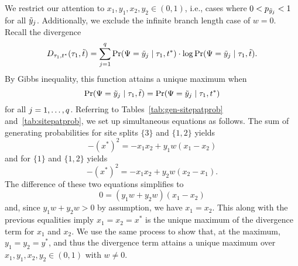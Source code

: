 We restrict our attention to $x_1,y_1,x_2,y_2\in(0,1)$, i.e., cases where $0<p_{\tilde{y}_j}<1$ for all $\tilde{y}_j$.
Additionally, we exclude the infinite branch length case of $w=0$.
Recall the divergence
\[
D_{\tau_1,t^*}(\tau_1,\tilde{t}) = \sum_{j=1}^q \Pr(\Psi=\tilde{y}_j \mid \tau_1, t^*)\cdot\log \Pr(\Psi=\tilde{y}_j \mid \tau_1, \tilde{t}).
\]
By Gibbs inequality, this function attains a unique maximum when
\[
\Pr(\Psi=\tilde{y}_j \mid \tau_1, \tilde{t}) = \Pr(\Psi=\tilde{y}_j \mid \tau_1, t^*)
\]
for all $j=1,\ldots,q$.
Referring to Tables~\ref{tab:gen-sitepatprob} and~\ref{tab:sitepatprob}, we set up simultaneous equations as follows.
The sum of generating probabilities for site splits $\{3\}$ and $\{1,2\}$ yields
\[
-(x^*)^2 = -x_1x_2+y_1w(x_1-x_2)
\]
and for $\{1\}$ and $\{1,2\}$ yields
\[
-(x^*)^2 = -x_1x_2+y_2w(x_2-x_1).
\]
The difference of these two equations simplifies to
\[
0 = (y_1w+y_2w)(x_1-x_2)
\]
and, since $y_1w+y_2w > 0$ by assumption, we have $x_1=x_2$.
This along with the previous equalities imply $x_1=x_2=x^*$ is the unique maximum of the divergence term for $x_1$ and $x_2$.
We use the same process to show that, at the maximum, $y_1=y_2=y^*$, and thus the divergence term attains a unique maximum over $x_1,y_1,x_2,y_2\in(0,1)$ with $w \neq 0$.

